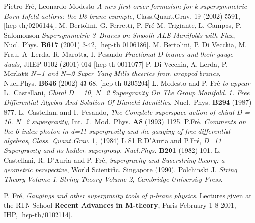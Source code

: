 \documentclass[a4paper,11pt]{article}
\begin{document}
\begin{thebibliography}{99}
%
  Pietro Fr\'e, Leonardo Modesto {\it A new first order formalism for k-supersymmetric Born Infeld actions:
the D3-brane example}, Class.Quant.Grav. 19 (2002) 5591, [hep-th/0206144].
%
%
 M. Bertolini, G. Ferretti, P. Fr\'e M. Trigiante, L. Campos, P. Salomonson
{\it Supersymmetric 3--Branes on Smooth ALE Manifolds
with Flux}, Nucl. Phys. {\bf B617} (2001) 3-42, [hep-th 0106186].
%
 M. Bertolini, P. Di Vecchia, M. Frau, A. Lerda, R. Marotta, I. Pesando {\it Fractional D-branes and their gauge duals}, JHEP 0102 (2001) 014 [hep-th 0011077] 
%
 P. Di Vecchia, A. Lerda, P. Merlatti {\it 
N=1 and N=2 Super Yang-Mills theories from wrapped branes},   
Nucl.Phys. {\bf B646} (2002) 43-68,
[hep-th 0205204] 
%
 L. Modesto and P. Fr\'e {\it to appear}
%
 L.~Castellani,
\emph{Chiral D = 10, N=2 Supergravity On The Group Manifold.
 1. Free Differential Algebra And Solution Of Bianchi Identities},
Nucl.\ Phys. {\bf B294} (1987) 877.
%
 L.~Castellani and I.~Pesando,
\emph{The Complete superspace action of chiral D = 10, N=2
supergravity}, Int.\ J.\ Mod.\ Phys. {\bf A8} (1993) 1125.
%
%
 P.Fr\'e, \emph{Comments on the 6-index photon
in d=11 supergravity and the gauging of free differential algebras}, {\it Class. Quant.Grav.} {\bf 1},
(1984) {L 81}
%
 R.D'Auria and P.Fr\'e, \emph{D=11 Supergravity
and its hidden supergroup}, {\it Nucl.Phys.} {\bf B201} (1982) 101.
%
%
%
%
%
%
 L. Castellani, R. D'Auria and P. Fr\'e,
\emph{Supergravity and Superstring theory: a geometric perspective},
World Scientific, Singapore (1990).
%
%
%
%
%
%
%
 Polchinski J.
\emph{String Theory Volume 1},
\emph{String Theory Volume 2},
\emph{Cambridge University Press}.
%
%
%
%
%
%

%
%
P. Fr\'e, \emph{ Gaugings and other supergravity tools of p-brane physics},
 Lectures given at the RTN School {\bf Recent Advances in M-theory}, Paris February 1-8 2001, IHP, [hep-th/0102114].
%
\end{thebibliography}
\end{document}

